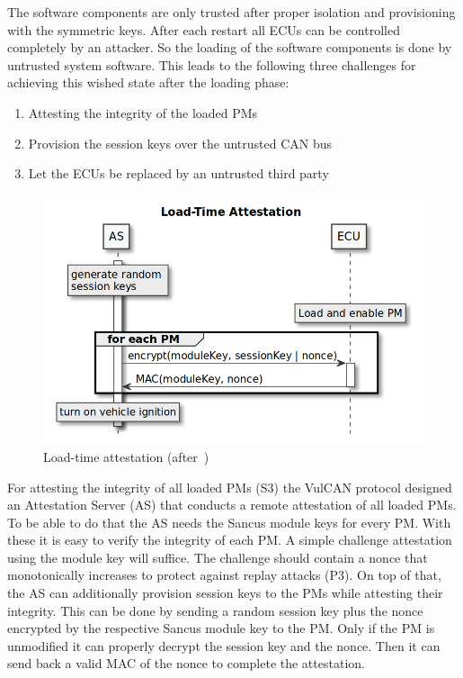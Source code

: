 The software components are only trusted after proper isolation and provisioning with the symmetric keys. After each restart all ECUs can be controlled completely by an attacker. So the loading of the software components is done by untrusted system software. This leads to the following three challenges for achieving this wished state after the loading phase:

\begin{enumerate}
    \item Attesting the integrity of the loaded PMs
    \item Provision the session keys over the untrusted CAN bus
    \item Let the ECUs be replaced by an untrusted third party
\end{enumerate}

\begin{figure}[ht]
    \centering
    \captionsetup{justification=centering}
	\includegraphics[width=1\linewidth]{Figures/VulCAN_attestation.png}
	\caption[]{Load-time attestation (after~\cite{VanBulck2017})}\label{fig:vulcan_load_attestation}
\end{figure}

For attesting the integrity of all loaded PMs (S3) the VulCAN protocol designed
an Attestation Server (AS) that conducts a remote attestation of all loaded PMs.
To be able to do that the AS needs the Sancus module keys for every PM\@. With
these it is easy to verify the integrity of each PM\@. A simple challenge
attestation using the module key will suffice. The challenge should contain a
nonce that monotonically increases to protect against replay attacks (P3). On
top of that, the AS can additionally provision session keys to the PMs while
attesting their integrity. This can be done by sending a random session key plus
the nonce encrypted by the respective Sancus module key to the PM\@. Only if the
PM is unmodified it can properly decrypt the session key and the nonce. Then it
can send back a valid MAC of the nonce to complete the attestation.

